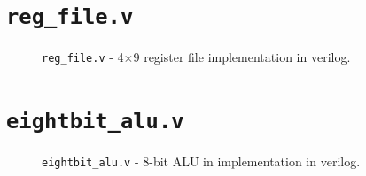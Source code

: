 \documentclass[12pt, letterpaper]{article}
\begin{document}
\newpage
\appendix
\appendixpage
\addappheadtotoc 

\section{\texttt{reg\_file.v}} \label{reg_file_module}
\FloatBarrier
\begin{figure}[h]
	
	\caption{\texttt{reg\_file.v} - 4$\times$9 register file implementation in verilog.}
\end{figure}
\FloatBarrier

\section{\texttt{eightbit\_alu.v}} \label{eightbit_alu}
\FloatBarrier
\begin{figure}[h]
	
	\caption{\texttt{eightbit\_alu.v} - 8-bit ALU in implementation in verilog.}
\end{figure}
\FloatBarrier
\end{document}
